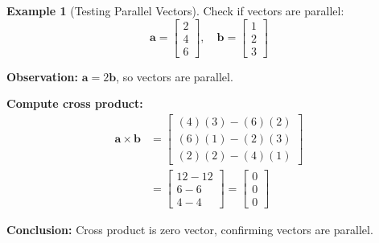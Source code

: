 \documentclass[12pt,a4paper]{article}
\theoremstyle{definition}
\newtheorem{example}{Example}[section]
\begin{document}
\begin{example}[Testing Parallel Vectors]
Check if vectors are parallel:
\begin{equation}
\mathbf{a} = \begin{bmatrix} 2 \\ 4 \\ 6 \end{bmatrix}, \quad
\mathbf{b} = \begin{bmatrix} 1 \\ 2 \\ 3 \end{bmatrix}
\end{equation}

\textbf{Observation:} $\mathbf{a} = 2\mathbf{b}$, so vectors are parallel.

\textbf{Compute cross product:}
\begin{align}
\mathbf{a} \times \mathbf{b} &= \begin{bmatrix}
(4)(3) - (6)(2) \\
(6)(1) - (2)(3) \\
(2)(2) - (4)(1)
\end{bmatrix} \\
&= \begin{bmatrix}
12 - 12 \\
6 - 6 \\
4 - 4
\end{bmatrix} = \begin{bmatrix}
0 \\
0 \\
0
\end{bmatrix}
\end{align}

\textbf{Conclusion:} Cross product is zero vector, confirming vectors are parallel.
\end{example}
\end{document}
